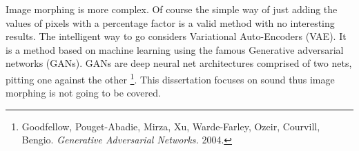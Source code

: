 Image morphing is more complex. Of course the simple way of just adding the values of pixels with a percentage factor is a valid method with no interesting results. The intelligent way to go considers Variational Auto-Encoders (VAE). It is a method based on machine learning using the famous Generative adversarial networks (GANs). GANs are deep neural net architectures comprised of two nets, pitting one against the other \footnote{Goodfellow, Pouget-Abadie, Mirza, Xu, Warde-Farley, Ozeir, Courvill, Bengio. \textit{Generative Adversarial Networks.} 2004. \nocite{GANs}}. This dissertation focuses on sound thus image morphing is not going to be covered.


